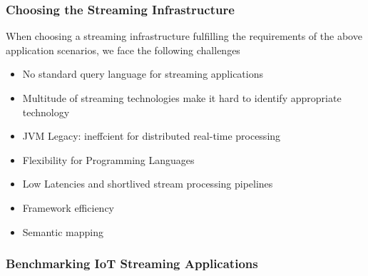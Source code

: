 \subsubsection{Choosing the Streaming Infrastructure}
When choosing a streaming infrastructure fulfilling the requirements of the above application scenarios, we face the following challenges
\begin{itemize}
\item No standard query language for streaming applications 
\item Multitude of streaming technologies make it hard to identify appropriate technology
\item JVM Legacy: ineffcient for distributed real-time processing
\item Flexibility for Programming Languages
\item Low Latencies and shortlived stream processing pipelines
\item Framework efficiency
\item Semantic mapping
\end{itemize}
\subsubsection{Benchmarking IoT Streaming Applications}
